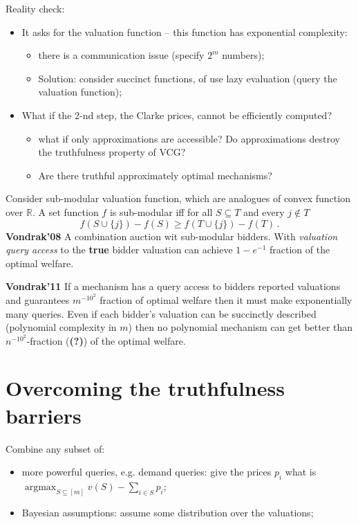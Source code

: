 \documentclass[a4paper]{article}
\newcommand{\Real}{\mathbb{R}}
\newcommand{\argmax}{\mathop{\text{argmax}}}
\newcommand{\wat}{\textbf{(?)}}
\begin{document}
Reality check:\begin{itemize}
	\item It asks for the valuation function -- this function has exponential complexity:
	\begin{itemize}
		\item there is a communication issue (specify $2^m$ numbers);
		\item Solution: consider succinct functions, of use lazy evaluation (query the
		valuation function);
	\end{itemize}
	\item What if the $2$-nd step, the Clarke prices, cannot be efficiently computed?
	\begin{itemize}
		\item what if only approximations are accessible? Do approximations destroy
		the truthfulness property of VCG?
		\item Are there truthful approximately optimal mechanisms?
	\end{itemize}
\end{itemize}

Consider sub-modular valuation function, which are analogues of convex function over
$\Real$. A set function $f$ is sub-modular iff for all $S\subseteq T$ and every $j\notin T$
\begin{equation}
	f(S\cup\{j\}) - f(S) \geq f(T\cup\{j\}) - f(T)\,.
\end{equation}
\textbf{Vondrak'08} A combination auction wit sub-modular bidders. With \emph{valuation
query access} to the \textbf{true} bidder valuation can achieve $1-e^{-1}$ fraction of the
optimal welfare.

\textbf{Vondrak'11} If a mechanism has a query access to bidders reported valuations and
guarantees $m^{-10^2}$ fraction of optimal welfare then it must make exponentially many
queries. Even if each bidder's valuation can be succinctly described (polynomial complexity
in $m$) then no polynomial mechanism can get better than $n^{-10^2}$-fraction (\wat) of the
optimal welfare.


\section{Overcoming the truthfulness barriers} %
\label{sec:overcoming_the_truthfulness_barriers}

Combine any subset of:\begin{itemize}
	\item more powerful queries, e.g. demand queries: give the prices $p_i$
	what is $\argmax_{S\subseteq [m]} v(S) - \sum_{i\in S} p_i$;
	\item Bayesian assumptions: assume some distribution over the valuations;
\end{itemize}
\end{document}
